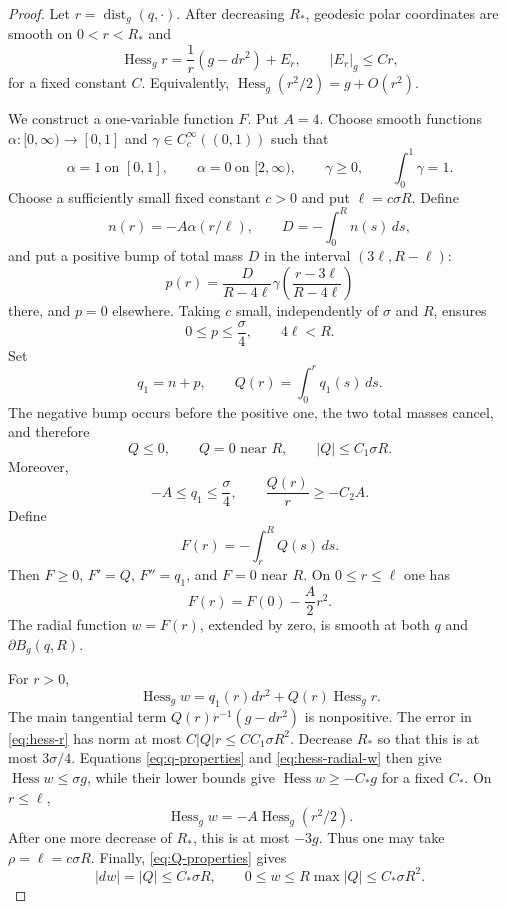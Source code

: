 \documentclass[11pt]{amsart}
\theoremstyle{definition}
\newcommand{\Hess}{\operatorname{Hess}}
\newcommand{\dist}{\operatorname{dist}}
\begin{document}
\begin{proof}
Let $r=\dist_g(q,\cdot)$.  After decreasing $R_*$, geodesic polar coordinates are smooth on $0<r<R_*$ and
\begin{equation}\label{eq:hess-r}
 \Hess_g r
 =\frac1r(g-dr^2)+E_r,
 \qquad
 |E_r|_g\le C r,
\end{equation}
for a fixed constant $C$.  Equivalently,
$\Hess_g(r^2/2)=g+O(r^2)$.

We construct a one-variable function $F$.  Put $A=4$.  Choose smooth functions
$\alpha:[0,\infty)\to[0,1]$ and
$\gamma\in C_c^\infty((0,1))$ such that
\[
 \alpha=1\ \text{on }[0,1],\qquad
 \alpha=0\ \text{on }[2,\infty),\qquad
 \gamma\ge0,\qquad \int_0^1\gamma=1.
\]
Choose a sufficiently small fixed constant $c>0$ and put
$\ell=c\sigma R$.  Define
\[
 n(r)=-A\alpha(r/\ell),
 \qquad
 D=-\int_0^R n(s)\,ds,
\]
and put a positive bump of total mass $D$ in the interval
$(3\ell,R-\ell)$:
\[
 p(r)=
 \frac{D}{R-4\ell}
 \gamma\!\left(\frac{r-3\ell}{R-4\ell}\right)
\]
there, and $p=0$ elsewhere.  Taking $c$ small, independently of
$\sigma$ and $R$, ensures
\[
 0\le p\le\frac{\sigma}{4},
 \qquad 4\ell<R.
\]
Set
\[
 q_1=n+p,
 \qquad
 Q(r)=\int_0^r q_1(s)\,ds.
\]
The negative bump occurs before the positive one, the two total masses cancel, and therefore
\begin{equation}\label{eq:Q-properties}
 Q\le0,\qquad Q=0\text{ near }R,
 \qquad |Q|\le C_1\sigma R.
\end{equation}
Moreover,
\begin{equation}\label{eq:q-properties}
 -A\le q_1\le\frac{\sigma}{4},
 \qquad
 \frac{Q(r)}r\ge-C_2A.
\end{equation}
Define
\[
 F(r)=-\int_r^R Q(s)\,ds.
\]
Then $F\ge0$, $F'=Q$, $F''=q_1$, and $F=0$ near $R$.  On
$0\le r\le\ell$ one has
\[
 F(r)=F(0)-\frac A2r^2.
\]
The radial function $w=F(r)$, extended by zero, is smooth at both
$q$ and $\partial B_g(q,R)$.

For $r>0$,
\begin{equation}\label{eq:hess-radial-w}
 \Hess_g w=q_1(r)dr^2+Q(r)\Hess_g r.
\end{equation}
The main tangential term $Q(r)r^{-1}(g-dr^2)$ is nonpositive.  The error in \eqref{eq:hess-r} has norm at most
$C|Q|r\le C C_1\sigma R^2$.  Decrease $R_*$ so that this is at most $3\sigma/4$.  Equations
\eqref{eq:q-properties} and \eqref{eq:hess-radial-w} then give
$\Hess w\le\sigma g$, while their lower bounds give
$\Hess w\ge-C_*g$ for a fixed $C_*$.  On $r\le\ell$,
\[
 \Hess_gw=-A\Hess_g(r^2/2).
\]
After one more decrease of $R_*$, this is at most $-3g$.
Thus one may take $\rho=\ell=c\sigma R$.  Finally,
\eqref{eq:Q-properties} gives
\[
 |dw|=|Q|\le C_*\sigma R,
 \qquad
 0\le w\le R\max|Q|\le C_*\sigma R^2.
\]
\end{proof}
\end{document}
